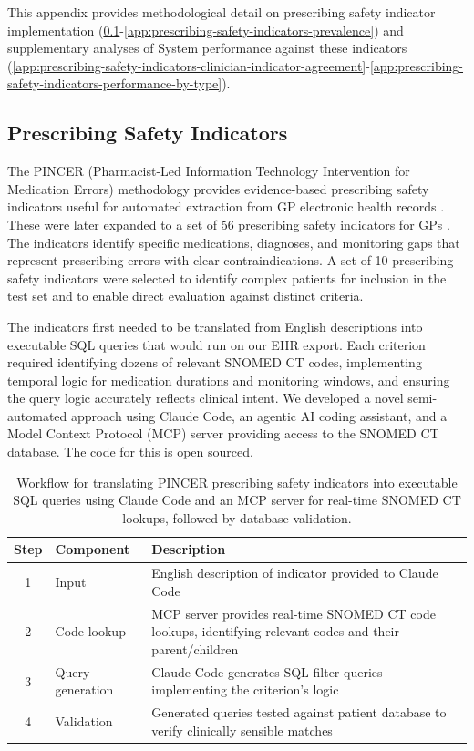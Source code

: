 \label{app:prescribing-safety-indicators}
This appendix provides methodological detail on prescribing safety indicator implementation (\ref{app:prescribing-safety-indicators-subsection}-\ref{app:prescribing-safety-indicators-prevalence}) and supplementary analyses of System performance against these indicators (\ref{app:prescribing-safety-indicators-clinician-indicator-agreement}-\ref{app:prescribing-safety-indicators-performance-by-type}).
\subsection{Prescribing Safety Indicators}
    \label{app:prescribing-safety-indicators-subsection}
    The PINCER (Pharmacist-Led Information Technology Intervention for Medication Errors) methodology provides evidence-based prescribing safety indicators useful for automated extraction from GP electronic health records \cite{Avery2012}. These were later expanded to a set of 56 prescribing safety indicators for GPs \cite{Spencere181}. The indicators identify specific medications, diagnoses, and monitoring gaps that represent prescribing errors with clear contraindications. A set of 10 prescribing safety indicators were selected to identify complex patients for inclusion in the test set and to enable direct evaluation against distinct criteria.

    The indicators first needed to be translated from English descriptions into executable SQL queries that would run on our EHR export. Each criterion required identifying dozens of relevant SNOMED CT codes, implementing temporal logic for medication durations and monitoring windows, and ensuring the query logic accurately reflects clinical intent. We developed a novel semi-automated approach using Claude Code, an agentic AI coding assistant, and a Model Context Protocol (MCP) server providing access to the SNOMED CT database. The code for this is open sourced.
    
    
    \begin{table}[h]
        

        \centering
        \begin{tabular}{@{}clp{10cm}@{}}
        \toprule
        \textbf{Step} & \textbf{Component} & \textbf{Description} \\
        \midrule
        1 & Input & English description of indicator provided to Claude Code \\
        2 & Code lookup & MCP server provides real-time SNOMED CT code lookups, identifying relevant codes and their parent/children \\
        3 & Query generation & Claude Code generates SQL filter queries implementing the criterion's logic \\
        4 & Validation & Generated queries tested against patient database to verify clinically sensible matches \\
        \bottomrule
        \end{tabular}
        \caption{Workflow for translating PINCER prescribing safety indicators into executable SQL queries using Claude Code and an MCP server for real-time SNOMED CT lookups, followed by database validation.}
    \label{tab:queries}
    \end{table}

